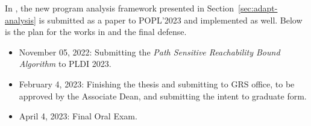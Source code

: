 In , the new program analysis framework presented in Section~\ref{sec:adapt-analysis}
 is submitted as a paper to POPL'2023 and implemented as well. 
 Below is the plan for
 the works in  and the final defense.

\begin{itemize}
    \item November 05, 2022: Submitting the \emph{Path Sensitive Reachability Bound Algorithm} to PLDI 2023.
    \item February 4, 2023: Finishing the thesis and submitting to GRS office, to be approved by the Associate Dean, and submitting the intent to graduate form.
    \item April 4, 2023: Final Oral Exam. 
\end{itemize}